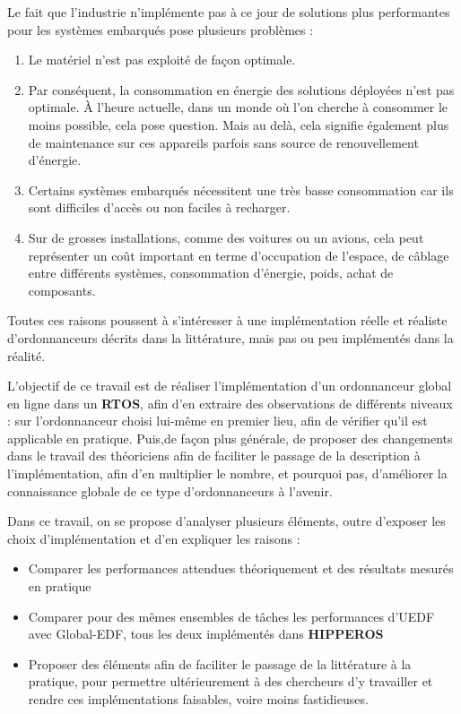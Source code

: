 	Le fait que l'industrie n'implémente pas à ce jour de solutions plus \og performantes \fg{} 
	pour les systèmes embarqués pose plusieurs problèmes :
	\begin{enumerate}
		\item Le matériel n'est pas exploité de façon optimale.
		\item Par conséquent, la consommation en énergie des solutions déployées n'est 
		pas optimale.
		À l'heure actuelle, dans un monde où l'on cherche à consommer le moins possible, 
		cela pose question. Mais au delà, cela signifie également plus de maintenance 
		sur ces appareils parfois sans source de renouvellement d'énergie.
		\item Certains systèmes embarqués nécessitent une très basse consommation car 
		ils sont difficiles d'accès ou non faciles à recharger.
		\item Sur de grosses installations, comme des voitures ou un avions, cela peut représenter 
		un coût important en terme d'occupation de l'espace, de câblage entre différents systèmes, 
		consommation d'énergie, poids, achat de composants.
	\end{enumerate}
	
	Toutes ces raisons poussent à s'intéresser à une implémentation réelle et réaliste 
	d'ordonnanceurs décrits dans la littérature, mais pas ou peu implémentés dans la réalité. \newline
	
	L'objectif de ce travail est de réaliser l'implémentation d'un ordonnanceur global en ligne 
	dans un \textbf{RTOS}, afin d'en extraire des observations de différents niveaux :
	sur l'ordonnanceur choisi lui-même en premier lieu, afin de vérifier qu'il est applicable en pratique.
	Puis,de façon plus générale, de proposer des changements dans le travail des théoriciens afin de faciliter le passage 
	de la description à l'implémentation, afin d'en multiplier le nombre, et pourquoi pas, d'améliorer la connaissance globale 
	de ce type d'ordonnanceurs à l'avenir.\newline
		
	Dans ce travail, on se propose d’analyser plusieurs éléments, outre d’exposer les choix d’implémentation et d’en expliquer les raisons : \medskip
	\begin{itemize}
		\item Comparer les performances attendues théoriquement et des résultats mesurés en pratique
		\item Comparer pour des mêmes ensembles de tâches les performances d’UEDF avec Global-EDF, tous les deux implémentés
		dans \textbf{HIPPEROS}
		\item Proposer des éléments afin de faciliter le passage de la littérature à la pratique, pour permettre
		ultérieurement à des chercheurs d'y travailler et rendre ces implémentations 
		faisables, voire moins fastidieuses.
	\end{itemize}
	